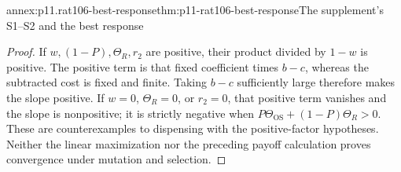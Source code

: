 \begin{annexitem}{annex:p11.rat106-best-response}{thm:p11-rat106-best-response}{The supplement's S1--S2 and the best response}
\begin{proof}
If \(w,(1-P),\Theta_R,r_2\) are positive, their product
divided by \(1-w\) is positive. The positive term is that
fixed coefficient times \(b-c\), whereas the subtracted cost
is fixed and finite. Taking \(b-c\) sufficiently large
therefore makes the slope positive. If \(w=0\),
\(\Theta_R=0\), or \(r_2=0\), that positive term
vanishes and the slope is nonpositive; it is strictly negative
when \(P\Theta_{\mathrm{OS}}+(1-P)\Theta_R>0\).
These are counterexamples to dispensing with the positive-factor
hypotheses. Neither the linear maximization nor the preceding
payoff calculation proves convergence under mutation and selection.
\end{proof}
\end{annexitem}
